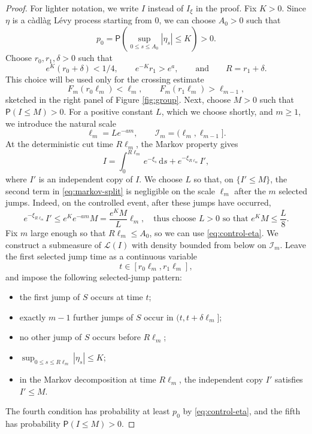 \documentclass[10pt,a4paper]{amsart}
\newcommand{\Prob}{\mathsf P}
\newcommand{\1}{\mathbf 1}
\newcommand{\law}{\mathcal L}
\newcommand{\dd}{\mathrm d}
\begin{document}
\begin{proof}
For lighter notation, we write $I$ instead of $I_\xi$ in the proof. Fix $K>0$. Since $\eta$ is a c\`adl\`ag L\'evy process starting from $0$, we can choose $A_0>0$ such that
\begin{equation}\label{eq:control-eta}
 p_0=
 \Prob\left(\sup_{0\leq s\leq A_0}|\eta_s|\leq K\right)>0.
\end{equation}
Choose $r_0,r_1,\delta>0$ such that
\begin{equation}\label{eq:constant-choice}
 e^K(r_0+\delta)<1/4,
 \qquad
 e^{-K}r_1>e^a,
 \qquad \text{and} \qquad
 R=r_1+\delta.
\end{equation}
This choice will be used only for the crossing estimate
\[
 F_m(r_0\ell_m)<\ell_m,
 \qquad
 F_m(r_1\ell_m)>\ell_{m-1},
\]
sketched in the right panel of Figure \ref{fig:group}. Next, choose $M>0$ such that $\Prob(I\leq M)>0$. For a positive constant $L$, which we choose shortly, and $m\geq1$, we introduce the natural scale
\begin{equation}\label{eq:scale}
 \ell_m=L e^{-am},
 \qquad
 \mathcal I_m=(\ell_m,\ell_{m-1}].
\end{equation}
At the deterministic cut time $R\ell_m$, the Markov property gives
\begin{equation}\label{eq:markov-split}
 I=
 \int_0^{R\ell_m}e^{-\xi_s}\,\dd s
 +e^{-\xi_{R\ell_m}}I',
\end{equation}
where $I'$ is an independent copy of $I$.
We choose $L$ so that, on $\{I'\leq M\}$, the second term in \eqref{eq:markov-split} is negligible on the scale $\ell_m$ after the $m$ selected jumps. Indeed, on the controlled event, after these jumps have occurred,
\begin{equation}
 e^{-\xi_{R\ell_m}}I'
 \leq e^K e^{-am}M
 =
 \frac{e^K M}{L}\ell_m,
 \quad
 \text{thus choose $L>0$ so that
 $e^K M\leq \frac{L}{8}$}.
\end{equation}
Fix $m$ large enough so that $R\ell_m\leq A_0$, so we can use \eqref{eq:control-eta}. We construct a submeasure of $\law(I)$ with density bounded from below on $\mathcal I_m$. Leave the first selected jump time as a continuous variable
\[
 t\in[r_0\ell_m,r_1\ell_m],
\]
and impose the following selected-jump pattern:
\begin{itemize}
 \item the first jump of $S$ occurs at time $t$;
 \item exactly $m-1$ further jumps of $S$ occur in $(t,t+\delta\ell_m]$;
 \item no other jump of $S$ occurs before $R\ell_m$;
 \item $\displaystyle \sup_{0\leq s\leq R\ell_m}|\eta_s|\leq K$;
 \item in the Markov decomposition at time $R\ell_m$, the independent copy $I'$ satisfies $I'\leq M$.
\end{itemize}
The fourth condition has probability at least $p_0$ by \eqref{eq:control-eta}, and the fifth has probability $\Prob(I\leq M)>0$.


\end{proof}
\end{document}
